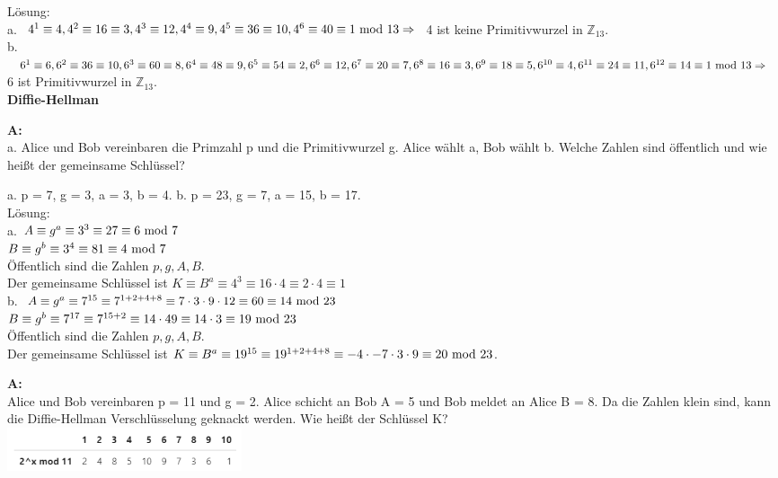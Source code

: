 \documentclass[landscape,twocolumn,a4paper]{article}
\begin{document}
 Lösung: \\
a.  $4^1 \equiv 4, 4^2 \equiv 16 \equiv 3, 4^3 \equiv 12, 4^4 \equiv 9, 4^5 \equiv 36 \equiv 10, 4^6 \equiv 40 \equiv 1 \text{ mod } 13 \Rightarrow$ 4 ist keine Primitivwurzel in  $\mathbb{Z}_{13}$. \\
b. $6^1 \equiv 6,  6^2 \equiv 36 \equiv 10, 6^3 \equiv 60 \equiv 8, 6^4 \equiv 48 \equiv 9,  6^5 \equiv 54 \equiv 2,  
6^6 \equiv 12,   6^7 \equiv 20 \equiv 7,   6^8 \equiv 16 \equiv 3,   6^9 \equiv 18 \equiv 5,  6^{10} \equiv 4,  
6^{11} \equiv 24 \equiv 11,  6^{12} \equiv 14 \equiv 1 \text{ mod } 13 \Rightarrow$ 6 ist Primitivwurzel in $\mathbb{Z}_{13}$. \\
 
 

\textbf{Diffie-Hellman} \bigskip

\textbf{A:}   \\
a. Alice und Bob vereinbaren die Primzahl p und die Primitivwurzel g.
Alice wählt a, Bob wählt b. Welche Zahlen sind öffentlich und wie heißt der gemeinsame Schlüssel?

a.  p = 7, g = 3, a = 3, b = 4.  \quad
b.  p = 23, g = 7, a = 15, b = 17. \\

Lösung: \\
a. $A \equiv g^a  \equiv 3^3  \equiv 27  \equiv  6 \text{ mod } 7$ \\
$B \equiv g^b \equiv 3^4  \equiv 81  \equiv  4 \text{ mod } 7$   \\
Öffentlich sind die Zahlen $p, g, A, B$.\\
Der gemeinsame Schlüssel ist $K \equiv B^a \equiv 4^3 \equiv 16 \cdot 4 \equiv 2 \cdot 4 \equiv 1$ \\
b. $A \equiv g^a  \equiv 7^{15} \equiv 7^{1+2+4+8} \equiv 7 \cdot 3 \cdot 9 \cdot 12 \equiv  60 \equiv 14 \text{ mod } 23$ \\
$B \equiv g^b \equiv 7^{17}  \equiv 7^{15+2}  \equiv  14 \cdot 49 \equiv  14 \cdot 3 \equiv 19 \text{ mod } 23$   \\
Öffentlich sind die Zahlen $p, g, A, B$.\\
Der gemeinsame Schlüssel ist $K \equiv B^a \equiv 19^{15} \equiv 19^{1+2+4+8} \equiv -4 \cdot -7 \cdot 3 \cdot 9 
\equiv 20 \text{ mod } 23$.\\


\bigskip {}

\textbf{A:}   \\
Alice und Bob vereinbaren p = 11 und g = 2. Alice schicht an Bob A = 5 und Bob meldet an Alice B = 8. Da die Zahlen klein sind, kann die Diffie-Hellman Verschlüsselung geknackt werden.  Wie heißt der Schlüssel K? \\
\includegraphics[width=6.9cm]{potenzen.png} \\
\end{document}
